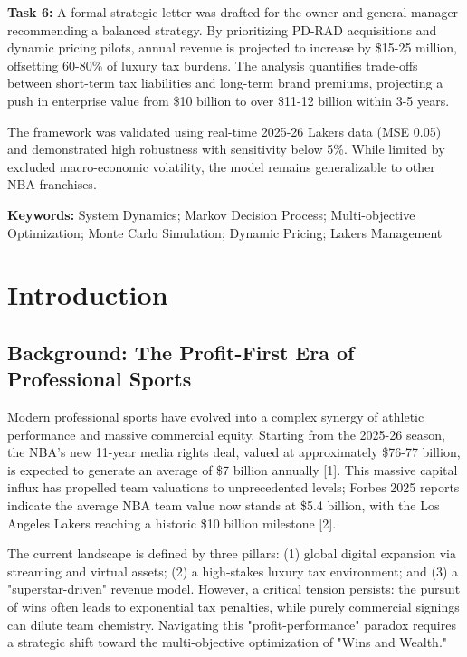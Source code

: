 \documentclass[12pt]{article}
\begin{document}
\textbf{Task 6:} A formal strategic letter was drafted for the owner and general manager recommending a balanced strategy. By prioritizing PD-RAD acquisitions and dynamic pricing pilots, annual revenue is projected to increase by \$15-25 million, offsetting 60-80\% of luxury tax burdens. The analysis quantifies trade-offs between short-term tax liabilities and long-term brand premiums, projecting a push in enterprise value from \$10 billion to over \$11-12 billion within 3-5 years.

The framework was validated using real-time 2025-26 Lakers data (MSE 0.05) and demonstrated high robustness with sensitivity below 5\%. While limited by excluded macro-economic volatility, the model remains generalizable to other NBA franchises.

\textbf{Keywords:} System Dynamics; Markov Decision Process; Multi-objective Optimization; Monte Carlo Simulation; Dynamic Pricing; Lakers Management

\newpage
\tableofcontents
\newpage

\section{Introduction}

\subsection{Background: The Profit-First Era of Professional Sports}
Modern professional sports have evolved into a complex synergy of athletic performance and massive commercial equity. Starting from the 2025-26 season, the NBA's new 11-year media rights deal, valued at approximately \$76-77 billion, is expected to generate an average of \$7 billion annually [1]. This massive capital influx has propelled team valuations to unprecedented levels; Forbes 2025 reports indicate the average NBA team value now stands at \$5.4 billion, with the Los Angeles Lakers reaching a historic \$10 billion milestone [2].

The current landscape is defined by three pillars: (1) global digital expansion via streaming and virtual assets; (2) a high-stakes luxury tax environment; and (3) a "superstar-driven" revenue model. However, a critical tension persists: the pursuit of wins often leads to exponential tax penalties, while purely commercial signings can dilute team chemistry. Navigating this "profit-performance" paradox requires a strategic shift toward the multi-objective optimization of "Wins and Wealth."
\end{document}

